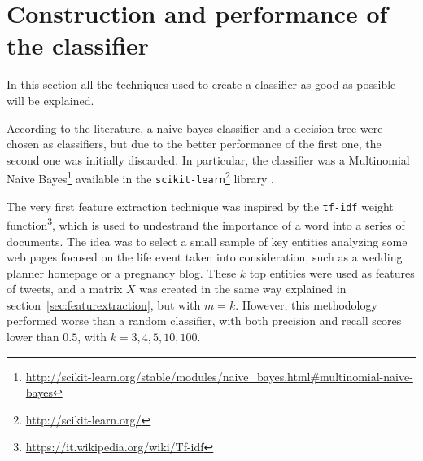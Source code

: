 \section{Construction and performance of the classifier}
In this section all the techniques used to create a classifier as good as possible will be explained.

 According to the literature, a naive bayes classifier and a decision tree were chosen as classifiers, but due to the better performance of the first one, the second one was initially discarded. In particular, the classifier was a Multinomial Naive Bayes\footnote{\url{http://scikit-learn.org/stable/modules/naive_bayes.html#multinomial-naive-bayes}} available in the \texttt{scikit-learn}\footnote{\url{http://scikit-learn.org/}} library \cite{scikit-learn}.

The very first feature extraction technique was inspired by the \texttt{tf-idf} weight function\footnote{\url{https://it.wikipedia.org/wiki/Tf-idf}}, which is used to undestrand the importance of a word into a series of documents. The idea was to select a small sample of key entities analyzing some web pages focused on the life event taken into consideration, such as a wedding planner homepage or a pregnancy blog. These $k$ top entities were used as features of tweets, and a matrix $X$ was created in the same way explained in section~\ref{sec:featurextraction}, but with $m = k$. However, this methodology performed worse than a random classifier, with both precision and recall scores lower than $0.5$, with $k = 3, 4, 5, 10, 100$.

\begin{table}[htbp]
\centering
{}\qquad\qquad
{}
\caption{The performance of the naive bayes were satisfactory on a very balanced dataset. Unfortunatly, users' timelines are very unbalanced, and this classifier turned out to be inappropriate.}
\end{table}

